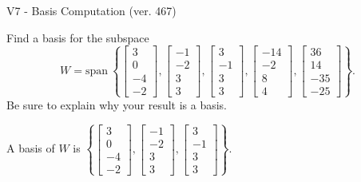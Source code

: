 \begin{exercise}
  \begin{exerciseTitle}V7 - Basis Computation (ver. 467)\end{exerciseTitle}
  \begin{exerciseStatement}
    Find a basis for the subspace 
\[W=\mathrm{span}\ \left\{\left[\begin{array}{r}
3 \\
0 \\
-4 \\
-2
\end{array}\right] , \left[\begin{array}{r}
-1 \\
-2 \\
3 \\
3
\end{array}\right] , \left[\begin{array}{r}
3 \\
-1 \\
3 \\
3
\end{array}\right] , \left[\begin{array}{r}
-14 \\
-2 \\
8 \\
4
\end{array}\right] , \left[\begin{array}{r}
36 \\
14 \\
-35 \\
-25
\end{array}\right]\right\}.\]
 Be sure to explain why your result is a basis.


  \end{exerciseStatement}
  \begin{exerciseAnswer}
   A basis of \(W\) is  \(\left\{\left[\begin{array}{r}
3 \\
0 \\
-4 \\
-2
\end{array}\right] , \left[\begin{array}{r}
-1 \\
-2 \\
3 \\
3
\end{array}\right] , \left[\begin{array}{r}
3 \\
-1 \\
3 \\
3
\end{array}\right]\right\}\).
  


  \end{exerciseAnswer}
\end{exercise}